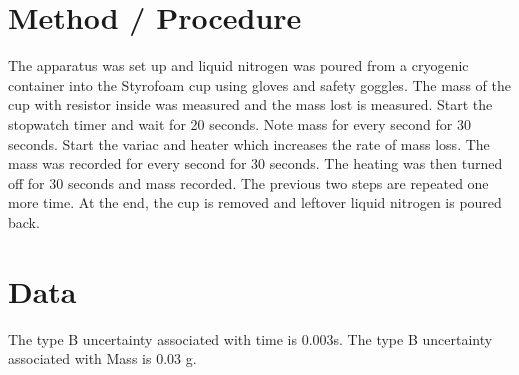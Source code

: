 \section{Method / Procedure}
The apparatus was set up and liquid nitrogen was poured from a cryogenic container into the Styrofoam cup using gloves and safety goggles. The mass of the cup with resistor inside was measured and the mass lost is measured. Start the stopwatch timer and wait for 20 seconds. Note mass for every second for 30 seconds. Start the variac and heater which increases the rate of mass loss. The mass was recorded for every second for 30 seconds. The heating was then turned off for 30 seconds and mass recorded. The previous two steps are repeated one more time. At the end, the cup is removed and leftover liquid nitrogen is poured back.


\section{Data}
The type B uncertainty associated with time is 0.003s. The type B uncertainty associated with Mass is 0.03 g.  

